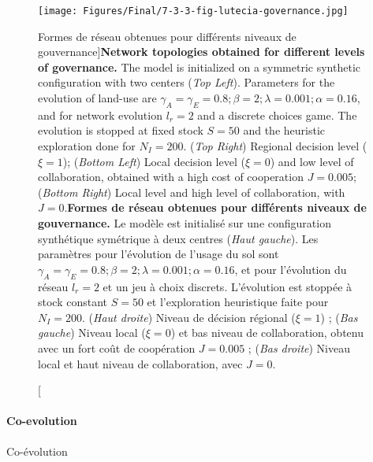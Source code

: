 \begin{figure}
	\texttt{[image: Figures/Final/7-3-3-fig-lutecia-governance.jpg]}
	\caption[Network topologies obtained for different levels of governance][Formes de réseau obtenues pour différents niveaux de gouvernance]{\textbf{Network topologies obtained for different levels of governance.} The model is initialized on a symmetric synthetic configuration with two centers (\textit{Top Left}). Parameters for the evolution of land-use are $\gamma_A = \gamma_E = 0.8 ; \beta = 2 ; \lambda = 0.001 ; \alpha = 0.16$, and for network evolution $l_r = 2$ and a discrete choices game. The evolution is stopped at fixed stock $S = 50$ and the heuristic exploration done for $N_I = 200$. (\textit{Top Right}) Regional decision level ($\xi = 1$); (\textit{Bottom Left}) Local decision level ($\xi = 0$) and low level of collaboration, obtained with a high cost of cooperation $J=0.005$; (\textit{Bottom Right}) Local level and high level of collaboration, with $J=0$.\label{fig:lutecia:governance}}{\textbf{Formes de réseau obtenues pour différents niveaux de gouvernance.} Le modèle est initialisé sur une configuration synthétique symétrique à deux centres (\textit{Haut gauche}). Les paramètres pour l'évolution de l'usage du sol sont $\gamma_A = \gamma_E = 0.8 ; \beta = 2 ; \lambda = 0.001 ; \alpha = 0.16$, et pour l'évolution du réseau $l_r = 2$ et un jeu à choix discrets. L'évolution est stoppée à stock constant $S = 50$ et l'exploration heuristique faite pour $N_I = 200$. (\textit{Haut droite}) Niveau de décision régional ($\xi = 1$) ; (\textit{Bas gauche}) Niveau local ($\xi = 0$) et bas niveau de collaboration, obtenu avec un fort coût de coopération $J=0.005$ ; (\textit{Bas droite}) Niveau local et haut niveau de collaboration, avec $J=0$.\label{fig:lutecia:governance}}
\end{figure}



\paragraph{Co-evolution}{Co-évolution}



